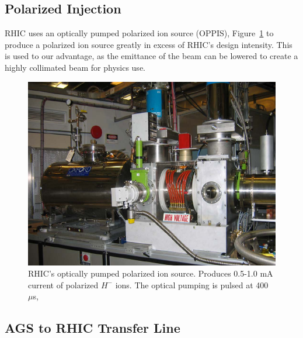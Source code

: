 \subsection{Polarized Injection}

RHIC uses an optically pumped polarized ion source (OPPIS),
Figure~\ref{fig:rhic_oppis} to produce a polarized ion source greatly in excess
of RHIC's design intensity. This is used to our advantage, as the emittance of
the beam can be lowered to create a highly collimated beam for physics use.

\begin{figure}[ht]
	\centering
	\includegraphics[width=0.8\linewidth]{./figures/rhic_oppis.png}
	\caption{
		RHIC's optically pumped polarized ion source. Produces 0.5-1.0 mA current of
		polarized $H^-$ ions. The optical pumping is pulsed at 400
		$\mu$s, \cite{Zelenski2007}
	}
	\label{fig:rhic_oppis}
\end{figure}

\clearpage
\subsection{AGS to RHIC Transfer Line}

